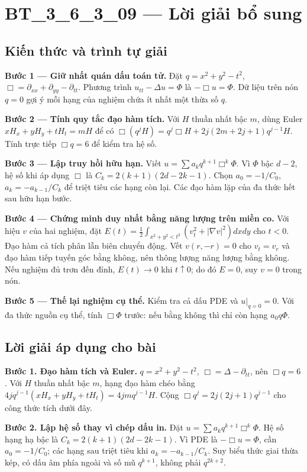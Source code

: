 \documentclass[10pt,a4paper]{article}
\begin{document}
\section*{BT\_3\_6\_3\_09 — Lời giải bổ sung}
\subsection*{Kiến thức và trình tự giải}
\textbf{Bước 1 — Giữ nhất quán dấu toán tử.} Đặt $q=x^2+y^2-t^2$, $\Box=\partial_{xx}+\partial_{yy}-\partial_{tt}$. Phương trình $u_{tt}-\Delta u=\Phi$ là $-\Box u=\Phi$. Dữ liệu trên nón $q=0$ gợi ý mỗi hạng của nghiệm chứa ít nhất một thừa số $q$.

\textbf{Bước 2 — Tính quy tắc đạo hàm tích.} Với $H$ thuần nhất bậc $m$, dùng Euler $xH_x+yH_y+tH_t=mH$ để có $\Box(q^jH)=q^j\Box H+2j(2m+2j+1)q^{j-1}H$. Tính trực tiếp $\Box q=6$ để kiểm tra hệ số.

\textbf{Bước 3 — Lập truy hồi hữu hạn.} Viết $u=\sum a_kq^{k+1}\Box^k\Phi$. Vì $\Phi$ bậc $d-2$, hệ số khi áp dụng $\Box$ là $C_k=2(k+1)(2d-2k-1)$. Chọn $a_0=-1/C_0$, $a_k=-a_{k-1}/C_k$ để triệt tiêu các hạng còn lại. Các đạo hàm lặp của đa thức hết sau hữu hạn bước.

\textbf{Bước 4 — Chứng minh duy nhất bằng năng lượng trên miền co.} Với hiệu $v$ của hai nghiệm, đặt $E(t)=\frac12\int_{x^2+y^2<t^2}(v_t^2+|\nabla v|^2)dxdy$ cho $t<0$. Đạo hàm cả tích phân lẫn biên chuyển động. Vết $v(r,-r)=0$ cho $v_t=v_r$ và đạo hàm tiếp tuyến góc bằng không, nên thông lượng năng lượng bằng không. Nếu nghiệm đủ trơn đến đỉnh, $E(t)\to0$ khi $t\uparrow0$; do đó $E=0$, suy $v=0$ trong nón.

\textbf{Bước 5 — Thế lại nghiệm cụ thể.} Kiểm tra cả dấu PDE và $u|_{q=0}=0$. Với đa thức nguồn cụ thể, tính $\Box\Phi$ trước: nếu bằng không thì chỉ còn hạng $a_0q\Phi$.
\subsection*{Lời giải áp dụng cho bài}
\textbf{Bước 1. Đạo hàm tích và Euler.} $q=x^2+y^2-t^2$, $\Box=\Delta-\partial_{tt}$, nên $\Box q=6$. Với $H$ thuần nhất bậc $m$, hạng đạo hàm chéo bằng $4j q^{j-1}(xH_x+yH_y+tH_t)=4jm q^{j-1}H$. Cộng $\Box q^j=2j(2j+1)q^{j-1}$ cho công thức tích dưới đây.

\textbf{Bước 2. Lập hệ số thay vì chép dấu in.} Đặt $u=\sum a_kq^{k+1}\Box^k\Phi$. Hệ số hạng hạ bậc là $C_k=2(k+1)(2d-2k-1)$. Vì PDE là $-\Box u=\Phi$, cần $a_0=-1/C_0$; các hạng sau triệt tiêu khi $a_k=-a_{k-1}/C_k$. Suy biểu thức giai thừa kép, có dấu âm phía ngoài và số mũ $q^{k+1}$, không phải $q^{2k+2}$.
\end{document}
